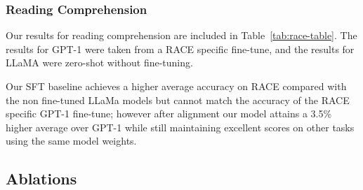 \subsubsection{Reading Comprehension}
Our results for reading comprehension are included in Table~\ref{tab:race-table}. The results for GPT-1 were taken from a RACE specific fine-tune, and the results for LLaMA \cite{touvron2023llama} were zero-shot without fine-tuning.

\begingroup
\vspace{-12pt}
\setlength{\tabcolsep}{9pt}
\setlength{\extrarowheight}{3pt}
\begin{table}[ht]
\centering
\caption{Comparison of accuracy on the RACE test set.}
\label{tab:race-table}
\vspace*{-0.5\baselineskip}
\end{table}
\endgroup

Our SFT baseline achieves a higher average accuracy on RACE compared with the non fine-tuned LLaMa models but cannot match the accuracy of the RACE specific GPT-1 fine-tune; however after alignment our model attains a 3.5\% higher average over GPT-1 while still maintaining excellent scores on other tasks using the same model weights. %

\subsection{Ablations}

